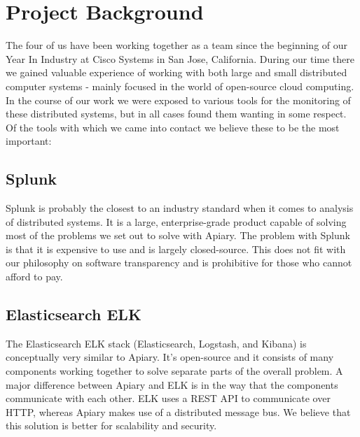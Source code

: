 \section{Project Background}

The four of us have been working together as a team since the beginning of our
Year In Industry at Cisco Systems in San Jose, California. During our time
there we gained valuable experience of working with both large and small
distributed computer systems - mainly focused in the world of open-source cloud
computing. In the course of our work we were exposed to various tools for the
monitoring of these distributed systems, but in all cases found them wanting in
some respect. Of the tools with which we came into contact we believe these to
be the most important:

\subsection{Splunk}

Splunk is probably the closest to an industry standard when it comes to
analysis of distributed systems. It is a large, enterprise-grade product
capable of solving most of the problems we set out to solve with Apiary. The
problem with Splunk is that it is expensive to use and is largely
closed-source. This does not fit with our philosophy on software transparency
and is prohibitive for those who cannot afford to pay.

\subsection{Elasticsearch ELK}

The Elasticsearch ELK stack (Elasticsearch, Logstash, and Kibana) is
conceptually very similar to Apiary. It’s open-source and it consists of many
components working together to solve separate parts of the overall problem. A
major difference between Apiary and ELK is in the way that the components
communicate with each other. ELK uses a REST API to communicate over HTTP,
whereas Apiary makes use of a distributed message bus. We believe that this
solution is better for scalability and security.
